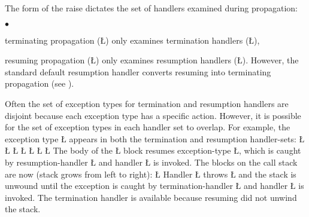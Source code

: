 \documentclass[openright,twoside]{report}
\begin{document}
The form of the raise dictates the set of handlers examined during propagation:
\begin{list}{$\bullet$}{\topsep=3pt\parsep=0pt\itemsep=0pt}
\item
terminating propagation (\LGinlinetrue\LGbegin\lgrinde\L{}\endlgrinde\LGend{}) only examines termination handlers (\LGinlinetrue\LGbegin\lgrinde\L{}\endlgrinde\LGend{}),
\item
resuming propagation (\LGinlinetrue\LGbegin\lgrinde\L{}\endlgrinde\LGend{}) only examines resumption handlers (\LGinlinetrue\LGbegin\lgrinde\L{}\endlgrinde\LGend{}).
However, the standard default resumption handler converts resuming into terminating propagation (see ).
\end{list}
Often the set of exception types for termination and resumption handlers are disjoint because each exception type has a specific action.
However, it is possible for the set of exception types in each handler set to overlap.
For example, the exception type \LGinlinetrue\LGbegin\lgrinde\L{}\endlgrinde\LGend{} appears in both the termination and resumption handler-sets:
\LGinlinefalse\LGbegin\lgrinde
\L{}
\L{}
\L{\LB{}}
\L{\LB{}}
\L{\LB{}}
\CE{}\L{\LB{}}
\CE{}\L{\LB{\}}}
\endlgrinde\LGend
The body of the \LGinlinetrue\LGbegin\lgrinde\L{}\endlgrinde\LGend{} block resumes exception-type \LGinlinetrue\LGbegin\lgrinde\L{}\endlgrinde\LGend{}, which is caught by resumption-handler \LGinlinetrue\LGbegin\lgrinde\L{}\endlgrinde\LGend{} and handler \LGinlinetrue\LGbegin\lgrinde\L{}\endlgrinde\LGend{} is invoked.
The blocks on the call stack are now (stack grows from left to right):
\LGinlinefalse\LGbegin\lgrinde
\L{}
\endlgrinde\LGend
Handler \LGinlinetrue\LGbegin\lgrinde\L{}\endlgrinde\LGend{} throws \LGinlinetrue\LGbegin\lgrinde\L{}\endlgrinde\LGend{} and the stack is unwound until the exception is caught by termination-handler \LGinlinetrue\LGbegin\lgrinde\L{}\endlgrinde\LGend{} and handler \LGinlinetrue\LGbegin\lgrinde\L{}\endlgrinde\LGend{} is invoked.
The termination handler is available because resuming did not unwind the stack.
\end{document}
